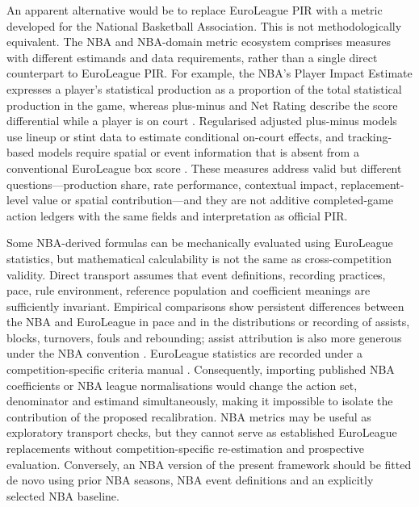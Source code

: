 \documentclass[pdflatex,sn-mathphys-num]{sn-jnl}
\begin{document}
An apparent alternative would be to replace EuroLeague PIR with a metric developed for the National Basketball Association. This is not methodologically equivalent. The NBA and NBA-domain metric ecosystem comprises measures with different estimands and data requirements, rather than a single direct counterpart to EuroLeague PIR. For example, the NBA's Player Impact Estimate expresses a player's statistical production as a proportion of the total statistical production in the game, whereas plus-minus and Net Rating describe the score differential while a player is on court \cite{NBAStatsGlossary2026}. Regularised adjusted plus-minus models use lineup or stint data to estimate conditional on-court effects, and tracking-based models require spatial or event information that is absent from a conventional EuroLeague box score \cite{DeshpandeJensen2016,GhimireEtAl2020,TernerFranks2021}. These measures address valid but different questions---production share, rate performance, contextual impact, replacement-level value or spatial contribution---and they are not additive completed-game action ledgers with the same fields and interpretation as official PIR.

Some NBA-derived formulas can be mechanically evaluated using EuroLeague statistics, but mathematical calculability is not the same as cross-competition validity. Direct transport assumes that event definitions, recording practices, pace, rule environment, reference population and coefficient meanings are sufficiently invariant. Empirical comparisons show persistent differences between the NBA and EuroLeague in pace and in the distributions or recording of assists, blocks, turnovers, fouls and rebounding; assist attribution is also more generous under the NBA convention \cite{MandicEtAl2019}. EuroLeague statistics are recorded under a competition-specific criteria manual \cite{EuroleagueStatsManual2025}. Consequently, importing published NBA coefficients or NBA league normalisations would change the action set, denominator and estimand simultaneously, making it impossible to isolate the contribution of the proposed recalibration. NBA metrics may be useful as exploratory transport checks, but they cannot serve as established EuroLeague replacements without competition-specific re-estimation and prospective evaluation. Conversely, an NBA version of the present framework should be fitted de novo using prior NBA seasons, NBA event definitions and an explicitly selected NBA baseline.
\end{document}

